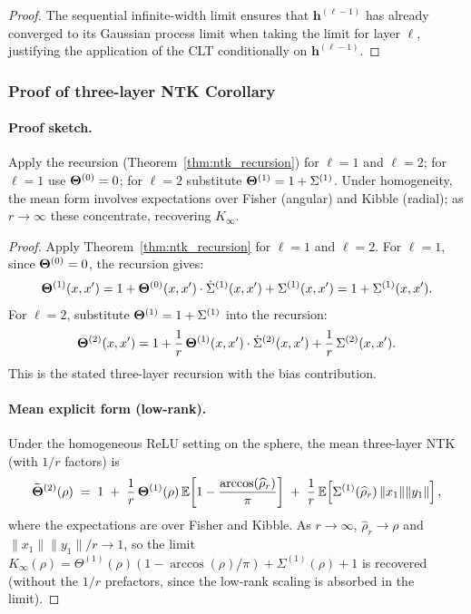 \begin{proof}
The sequential infinite-width limit ensures that \( \bm{h}^{(\ell-1)} \) has already converged to its Gaussian process limit when taking the limit for layer \( \ell \), justifying the application of the CLT conditionally on \( \bm{h}^{(\ell-1)} \).
\end{proof}

\subsubsection{Proof of three-layer NTK Corollary}
\label{appendix:proof-2layer}

\paragraph{Proof sketch.} Apply the recursion (Theorem~\ref{thm:ntk_recursion}) for \(\ell=1\) and \(\ell=2\); for \(\ell=1\) use \(\boldsymbol{\Theta}^{(0)}=0\); for \(\ell=2\) substitute \(\boldsymbol{\Theta}^{(1)}=1+\Sigma^{(1)}\). Under homogeneity, the mean form involves expectations over Fisher (angular) and Kibble (radial); as \(r\to\infty\) these concentrate, recovering \(K_\infty\).
\begin{proof}
\label{proof:two_layer_ntk}
Apply Theorem~\ref{thm:ntk_recursion} for \( \ell=1 \) and \( \ell=2 \). For \( \ell=1 \), since \( \boldsymbol{\Theta}^{(0)}=0 \), the recursion gives:
\begin{align}
\boldsymbol{\Theta}^{(1)}(x,x') = 1 + \boldsymbol{\Theta}^{(0)}(x,x')\cdot\dot{\Sigma}^{(1)}(x,x') + \Sigma^{(1)}(x,x') = 1 + \Sigma^{(1)}(x,x').
\end{align}
For \( \ell=2 \), substitute \( \boldsymbol{\Theta}^{(1)} = 1 + \Sigma^{(1)} \) into the recursion:
\begin{align}
\boldsymbol{\Theta}^{(2)}(x,x') = 1 + \frac{1}{r}\,\boldsymbol{\Theta}^{(1)}(x,x')\cdot\dot{\Sigma}^{(2)}(x,x') + \frac{1}{r}\,\Sigma^{(2)}(x,x').
\end{align}
This is the stated three-layer recursion with the bias contribution.
\paragraph{Mean explicit form (low-rank).}
Under the homogeneous ReLU setting on the sphere, the mean three-layer NTK (with \( 1/r \) factors) is
\begin{align}
\widetilde{\boldsymbol{\Theta}}^{(2)}(\rho) \;=\; 1 \;+\; \frac{1}{r}\,\boldsymbol{\Theta}^{(1)}(\rho)\,\mathbb{E}\!\left[1-\frac{\arccos(\widehat{\rho}_r)}{\pi}\right] \;+\; \frac{1}{r}\,\mathbb{E}\!\left[\Sigma^{(1)}(\widehat{\rho}_r)\,\|x_1\|\|y_1\|\right],
\end{align}
where the expectations are over Fisher and Kibble. As \( r\to\infty \), \( \hat{\rho}_r\to\rho \) and \( \|x_1\|\|y_1\|/r\to 1 \), so the limit \( K_\infty(\rho) = \Theta^{(1)}(\rho)(1-\arccos(\rho)/\pi) + \Sigma^{(1)}(\rho) + 1 \) is recovered (without the \( 1/r \) prefactors, since the low-rank scaling is absorbed in the limit).
\end{proof}

